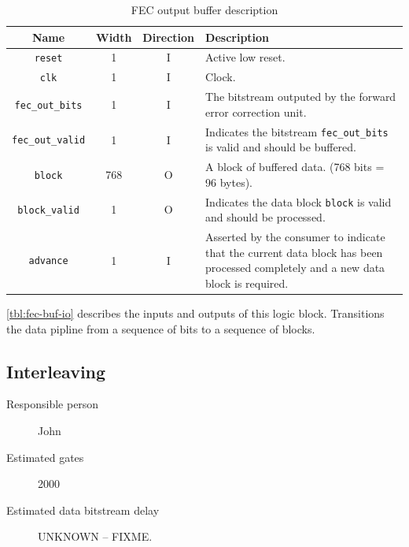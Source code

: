 \documentclass[dvips,10pt,twocolumn]{article}
\newcommand{\wire}{\texttt}
\begin{document}
\begin{table} \begin{tabularx}{\textwidth}{c|c|c|X}
	\label{tbl:fec-buf-io}
	Name & Width & Direction & Description \\ \hline

	\wire{reset} & 1 & I & Active low reset. \\

	\wire{clk} & 1 & I & Clock. \\

	\wire{fec\_out\_bits} & 1 & I & The bitstream outputed by the
	forward error correction unit. \\

	\wire{fec\_out\_valid} & 1 & I & Indicates the bitstream
	\wire{fec\_out\_bits} is valid and should be buffered. \\


	\wire{block} & 768 & O & A block of buffered data. (768 bits = 96
	bytes). \\

	\wire{block\_valid} & 1 & O & Indicates the data block
	\wire{block} is valid and should be processed. \\

	\wire{advance} & 1 & I & Asserted by the consumer to indicate that
	the current data block has been processed completely and a new data
	block is required. \\

\end{tabularx} \caption{FEC output buffer description} \end{table}

\autoref{tbl:fec-buf-io} describes the inputs and outputs of this logic
block.
Transitions the data pipline from a sequence of bits to a sequence of
blocks.


\subsection{Interleaving}
\label{sec:interleaving}
\begin{description}
	\item[Responsible person] John
	\item[Estimated gates] 2000
	\item[Estimated data bitstream delay] UNKNOWN -- FIXME.
\end{description}
	
\end{document}
